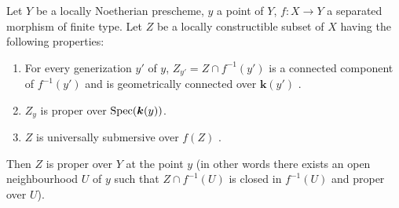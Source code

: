 \begin{proposition}[15.7.9]
\label{IV.15.7.9}
Let $Y$ be a locally Noetherian prescheme, $y$ a point of $Y$, $f:X\to Y$ a separated morphism of finite type.
Let $Z$ be a locally constructible subset of $X$ having the following properties:
\begin{enumerate}[label=(\roman*)]
  \item For every generization $y'$ of $y$, $Z_{y'}=Z\cap f^{-1}(y')$ is a connected component of $f^{-1}(y')$ and is geometrically connected over $\boldsymbol{k}(y')$ .
  \item $Z_y$ is proper over $\operatorname{Spec}(\boldsymbol{k}(y))$.
  \item $Z$ is universally submersive over $f(Z)$ .
\end{enumerate}
Then $Z$ is proper over $Y$ at the point $y$ (in other words  there exists an open neighbourhood $U$ of $y$ such that $Z\cap f^{-1}(U)$ is closed in $f^{-1}(U)$ and proper over $U$).
\end{proposition}

